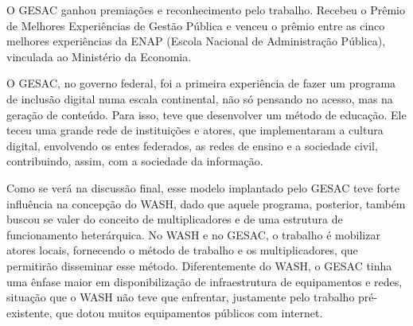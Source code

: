 \documentclass[
12pt,		%
openright,	%
twoside,  %
a4paper,			%
chapter=TITLE,		%
english,			%
french,				%
spanish,			%
brazil				%
]{USPSC-classe/USPSC}
\begin{document}
\noindent\begin{center}\mbox{\centering{}}\end{center}


O GESAC ganhou premia\c{c}\~oes e reconhecimento pelo trabalho. Recebeu o Pr\^emio de Melhores Experi\^encias de Gest\~ao P\'ublica e venceu o pr\^emio entre as cinco melhores experi\^encias da ENAP (Escola Nacional de Administra\c{c}\~ao P\'ublica), vinculada ao Minist\'erio da Economia.




O GESAC, no governo federal, foi a primeira experi\^encia de fazer um programa de inclus\~ao digital numa escala continental, n\~ao s\'o pensando no acesso, mas na gera\c{c}\~ao de conte\'udo. Para isso, teve que desenvolver um m\'etodo de educa\c{c}\~ao. Ele teceu uma grande rede de institui\c{c}\~oes e atores, que  implementaram  a cultura digital, envolvendo os entes federados, as redes de ensino  e a sociedade civil,  contribuindo, assim, com a sociedade da informa\c{c}\~ao.




Como se ver\'a na discuss\~ao final, esse modelo implantado pelo GESAC teve forte influ\^encia na concep\c{c}\~ao do WASH, dado que aquele programa, posterior, tamb\'em buscou se valer do conceito de multiplicadores e de uma estrutura de funcionamento heter\'arquica. No WASH e no GESAC, o trabalho \'e mobilizar atores locais, fornecendo o m\'etodo de trabalho e os multiplicadores, que permitir\~ao disseminar esse m\'etodo. Diferentemente do WASH, o GESAC tinha uma \^enfase maior em disponibiliza\c{c}\~ao de infraestrutura de equipamentos e redes, situa\c{c}\~ao que o WASH n\~ao teve que enfrentar, justamente pelo trabalho pr\'e-existente, que dotou muitos equipamentos p\'ublicos com internet.
\end{document}
